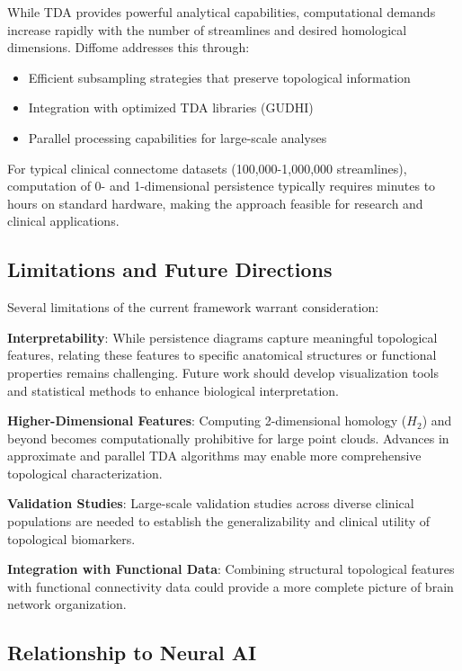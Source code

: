 \documentclass[12pt,a4paper]{article}
\begin{document}
While TDA provides powerful analytical capabilities, computational demands increase rapidly with the number of streamlines and desired homological dimensions. Diffome addresses this through:
\begin{itemize}
    \item Efficient subsampling strategies that preserve topological information
    \item Integration with optimized TDA libraries (GUDHI)
    \item Parallel processing capabilities for large-scale analyses
\end{itemize}

For typical clinical connectome datasets (100,000-1,000,000 streamlines), computation of 0- and 1-dimensional persistence typically requires minutes to hours on standard hardware, making the approach feasible for research and clinical applications.

\subsection{Limitations and Future Directions}

Several limitations of the current framework warrant consideration:

\textbf{Interpretability}: While persistence diagrams capture meaningful topological features, relating these features to specific anatomical structures or functional properties remains challenging. Future work should develop visualization tools and statistical methods to enhance biological interpretation.

\textbf{Higher-Dimensional Features}: Computing 2-dimensional homology ($H_2$) and beyond becomes computationally prohibitive for large point clouds. Advances in approximate and parallel TDA algorithms may enable more comprehensive topological characterization.

\textbf{Validation Studies}: Large-scale validation studies across diverse clinical populations are needed to establish the generalizability and clinical utility of topological biomarkers.

\textbf{Integration with Functional Data}: Combining structural topological features with functional connectivity data could provide a more complete picture of brain network organization.

\subsection{Relationship to Neural AI}
\end{document}
